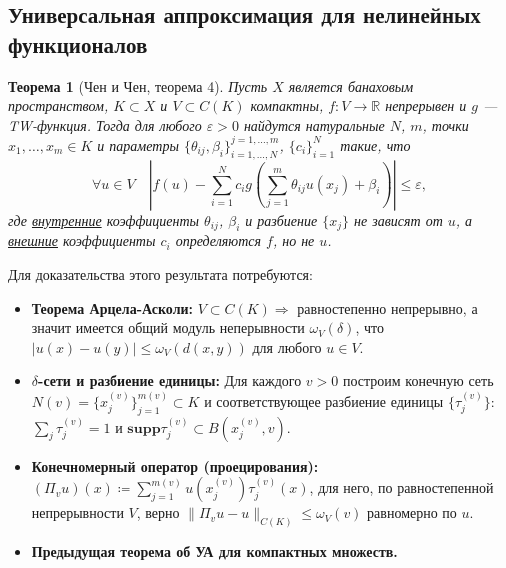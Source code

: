 \documentclass[a4paper, 12pt]{article}
\theoremstyle{definition}
\theoremstyle{plain}
\newtheorem*{theorem}{Теорема}
\theoremstyle{remark}
\theoremstyle{remark}
\theoremstyle{remark}
\begin{document}
\subsection*{Универсальная аппроксимация для нелинейных функционалов}
\begin{theorem}[Чен и Чен, теорема 4]
  \label{thm:uat_nonlin}
  Пусть $X$ является банаховым пространством, $K \subset X$ и $V \subset C(K)$ компактны, $f\colon V \to \mathbb{R}$ непрерывен и $g$ --- TW-функция.
  Тогда для любого $\varepsilon > 0$ найдутся натуральные $N$, $m$, точки $x_1, \dots, x_m \in K$ и параметры $\{\theta_{ij}, \beta_i\}_{i=1,\dots,N}^{j=1,\dots,m}$, $\{c_i\}_{i=1}^N$ такие, что
  $$\forall u \in V \quad \left|f(u) - \sum_{i=1}^N c_i g\left(\sum_{j=1}^m \theta_{ij} u(x_j) + \beta_i\right)\right| \le \varepsilon,$$
  где \underline{внутренние} коэффициенты $\theta_{ij}$, $\beta_i$ и разбиение $\{x_j\}$ не зависят от $u$, а \underline{внешние} коэффициенты $c_i$ определяются $f$, но не $u$.
\end{theorem}
Для доказательства этого результата потребуются:
\begin{itemize}
  \item \textbf{Теорема Арцела-Асколи:} $V \subset C(K) \Rightarrow$ равностепенно непрерывно, а значит имеется общий модуль неперывности $\omega_V(\delta)$, что $|u(x) - u(y)| \le \omega_V(d(x,y))$ для любого $u \in V$.
  \item \textbf{$\delta$-сети и разбиение единицы:} Для каждого $v > 0$ построим конечную сеть $N(v) = \{x_j^{(v)}\}_{j=1}^{m(v)} \subset K$ и соответствующее разбиение единицы $\{\tau_j^{(v)}\}$: $\sum_j \tau_j^{(v)} = 1$ и $\mathbf{supp}\tau_j^{(v)} \subset B\left(x_j^{(v)}, v\right)$.
  \item \textbf{Конечномерный оператор (проецирования):} $(\Pi_v u)(x) \coloneq \sum_{j=1}^{m(v)} u(x_j^{(v)}) \tau_j^{(v)}(x)$, для него, по равностепенной непрерывности $V$, верно $\|\Pi_v u - u\|_{C(K)} \le \omega_V(v)$ равномерно по $u$.
  \item \textbf{Предыдущая теорема об УА для компактных множеств.}
\end{itemize}
\end{document}
